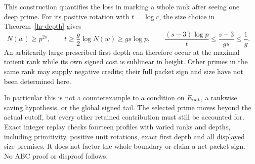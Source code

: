 This construction quantifies the loss in marking a whole rank after
seeing one deep prime. For its positive rotation with $t=\log c$,
the size choice in Theorem~\ref{hr-depth} gives
\[
 N(w)\ge p^{2s},\qquad t\ge\frac g2\log N(w)\ge gs\log p,
 \qquad \frac{(s-3)\log p}{t}\le\frac{s-3}{gs}\le\frac1g.
\]
An arbitrarily large prescribed first depth can therefore occur at
the maximal totient rank while its own signed cost is sublinear in
height. Other primes in the same rank may supply negative credits;
their full packet sign and size have not been determined here.

In particular this is not a counterexample to a condition on
$E_{\rm net}$, a rankwise saving hypothesis, or the global signed
tail. The selected prime moves beyond the actual cutoff, but every
other retained contribution must still be accounted for. Exact
integer replay checks fourteen profiles with varied ranks and depths,
including primitivity, positive unit rotations, exact first depth and
all displayed size premises. It does not factor the whole boundary
or claim a net packet sign. No ABC proof or disproof follows.

